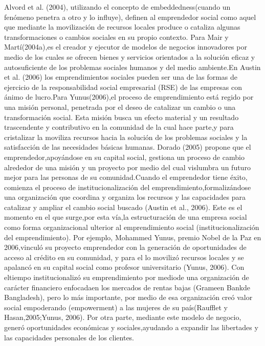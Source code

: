 \documentclass[11pt]{article}
\begin{document}
Alvord  et  al.  (2004),  utilizando  el  concepto  de embeddedness(cuando un fenómeno penetra a otro y lo influye), definen al emprendedor social como aquel que mediante la movilización de recursos locales produce o cataliza algunas transformaciones o cambios sociales en su propio contexto. Para Mair y Martí(2004a),es el creador y ejecutor de modelos de negocios innovadores por medio de los cuales se ofrecen bienes y servicios orientados a la solución eficaz y autosuficiente de los problemas sociales humanos y del medio ambiente.En Austin et al. (2006) los emprendimientos sociales pueden ser una de las formas de ejercicio de la responsabilidad social empresarial (RSE) de las empresas con ánimo de lucro.Para Yunus(2006),el proceso de emprendimiento está regido por una misión personal, penetrada por el deseo de catalizar un cambio o una transformación social. Esta misión busca un efecto material y un resultado trascendente y contributivo en la comunidad de la cual hace parte,y para cristalizar la moviliza recursos hacia la solución de los problemas sociales y la satisfacción de las necesidades básicas humanas. Dorado (2005) propone que el emprendedor,apoyándose en su capital social, gestiona un proceso de cambio alrededor de una misión y un proyecto por medio del cual vislumbra un futuro mejor para las personas de su comunidad.Cuando el emprendedor tiene éxito, comienza el proceso de institucionalización del emprendimiento,formalizándose una organización que coordina y organiza los recursos y las capacidades para catalizar y ampliar el cambio social buscado (Austin et al., 2006). Este es el momento en el que surge,por esta vía,la estructuración de una empresa social como forma organizacional ulterior  al  emprendimiento  social  (institucionalización  del  emprendimiento).  Por  ejemplo,  Mohammed Yunus, premio Nobel de la Paz en 2006,vinculó su proyecto emprendedor con la generación de oportunidades de acceso al crédito en su comunidad, y para el lo movilizó recursos locales y se apalancó en su capital social como profesor universitario (Yunus, 2006). Con eltiempo institucionalizó su emprendimiento por mediode  una  organización  de  carácter  financiero  enfocadaen los mercados de rentas bajas (Grameen Bankde Bangladesh), pero lo más importante, por medio de esa organización creó valor social empoderando (empowerment) a las mujeres de su país(Raufflet y Hasan,2005;Yunus, 2006). Por otra parte, mediante este modelo de negocio, generó oportunidades económicas y sociales,ayudando a expandir las libertades y las capacidades personales de los clientes.
\end{document}
